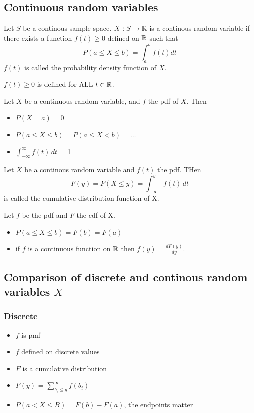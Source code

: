 \documentclass[11pt]{article}
\begin{document}
\subsection{Continuous random variables}
\begin{definition}
    Let $S$ be a continous sample space. $X: S \rightarrow \mathbb{R}$ is a continous random variable if there 
    exists a function $f(t) \ge 0$ defined on $\mathbb{R}$ such that 
    \[
        P(a \le X \le b) = \int_{a}^{b}f(t) dt
    \]
    $f(t)$ is called the probability density function of $X$.
\end{definition}
\begin{remark}
    $f(t) \ge 0$ is defined for ALL $t \in \mathbb{R}$.
\end{remark}
\begin{theorem}
    Let $X$ be a continuous random variable, and $f$ the pdf of $X$. Then
    \begin{itemize}
        \item $P(X = a) = 0$
        \item $P(a \le X \le b) = P(a \le X < b) = \dots$
        \item $\int_{-\infty}^{\infty} f(t)\, dt$ = 1
    \end{itemize}
\end{theorem}

\begin{definition}
    Let $X$ be a continous random variable and $f(t)$ the pdf. THen
    \[
        F(y) = P(X \le y) = \int_{-\infty}^{y}f(t) \, dt
    \]
    is called the cumulative distribution function of X.
\end{definition}

\begin{theorem}
   Let $f$ be the pdf and $F$ the cdf of X.
   \begin{itemize}
    \item $P(a \le X \le b) = F(b) = F(a)$
    \item if $f$ is a continuous function on $\mathbb{R}$ then $f(y) = \frac{dF(y)}{dy}$.
   \end{itemize}
    
\end{theorem}

\subsection{\texorpdfstring{Comparison of discrete and continous random variables $X$}{Comparison of discrete and continous X}}
\subsubsection{Discrete}
\begin{itemize}
    \item $f$ is pmf
    \item $f$ defined on discrete values
    \item $F$ is a cumulative distribution
    \item $F(y)$ = $\sum_{b_i \le y}^{\infty} f(b_i)$
    \item $P(a < X \le B) = F(b) - F(a)$, the endpoints matter
\end{itemize}
\end{document}
